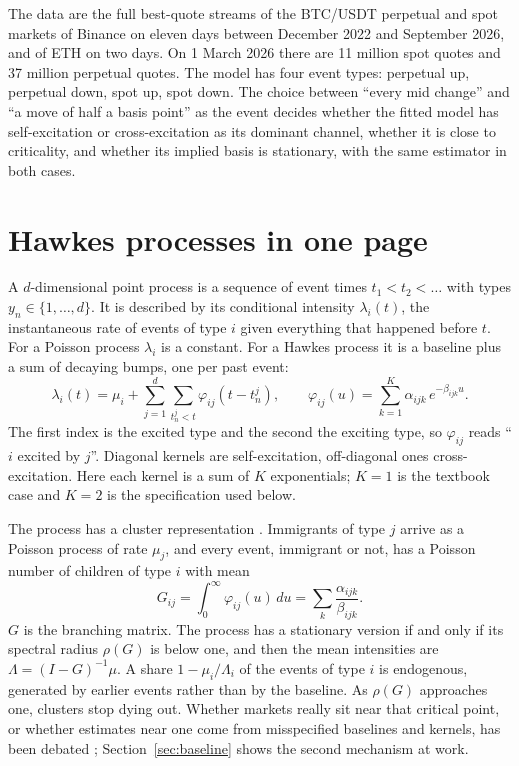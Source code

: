 \documentclass[a4paper,11pt]{article}
\begin{document}
The data are the full best-quote streams of the BTC/USDT perpetual and spot markets of Binance on eleven days between December 2022 and September 2026, and of ETH on two days. On 1 March 2026 there are 11 million spot quotes and 37 million perpetual quotes. The model has four event types: perpetual up, perpetual down, spot up, spot down. The choice between ``every mid change'' and ``a move of half a basis point'' as the event decides whether the fitted model has self-excitation or cross-excitation as its dominant channel, whether it is close to criticality, and whether its implied basis is stationary, with the same estimator in both cases.

\section{Hawkes processes in one page}

A $d$-dimensional point process is a sequence of event times $t_1 < t_2 < \dots$ with types $y_n \in \{1, \dots, d\}$. It is described by its conditional intensity $\lambda_i(t)$, the instantaneous rate of events of type $i$ given everything that happened before $t$. For a Poisson process $\lambda_i$ is a constant. For a Hawkes process \cite{hawkes1971} it is a baseline plus a sum of decaying bumps, one per past event:
\begin{equation}\label{eq:intensity}
\lambda_i(t) = \mu_i + \sum_{j=1}^{d} \sum_{t^j_n < t} \varphi_{ij}(t - t^j_n), \qquad \varphi_{ij}(u) = \sum_{k=1}^{K} \alpha_{ijk}\, e^{-\beta_{ijk} u}.
\end{equation}
The first index is the excited type and the second the exciting type, so $\varphi_{ij}$ reads ``$i$ excited by $j$''. Diagonal kernels are self-excitation, off-diagonal ones cross-excitation. Here each kernel is a sum of $K$ exponentials; $K = 1$ is the textbook case and $K = 2$ is the specification used below.

The process has a cluster representation \cite{hawkes1971, laub2015}. Immigrants of type $j$ arrive as a Poisson process of rate $\mu_j$, and every event, immigrant or not, has a Poisson number of children of type $i$ with mean
\begin{equation}\label{eq:G}
G_{ij} = \int_0^\infty \varphi_{ij}(u)\, du = \sum_{k} \frac{\alpha_{ijk}}{\beta_{ijk}} .
\end{equation}
$G$ is the branching matrix. The process has a stationary version if and only if its spectral radius $\rho(G)$ is below one, and then the mean intensities are $\Lambda = (I - G)^{-1} \mu$. A share $1 - \mu_i/\Lambda_i$ of the events of type $i$ is endogenous, generated by earlier events rather than by the baseline. As $\rho(G)$ approaches one, clusters stop dying out. Whether markets really sit near that critical point, or whether estimates near one come from misspecified baselines and kernels, has been debated \cite{hardiman2013, filimonov2015}; Section~\ref{sec:baseline} shows the second mechanism at work.
\end{document}

